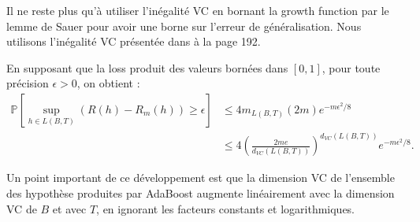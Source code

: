 \documentclass[12pt]{article}
\begin{document}
	Il ne reste plus qu'à utiliser l'inégalité VC en bornant la growth function par le lemme de Sauer pour avoir une borne sur l'erreur de généralisation.
	Nous utilisons l'inégalité VC présentée dans \cite{Bousquet2003-oz} à la page 192.
	
	En supposant que la loss produit des valeurs bornées dans $[0, 1]$, pour toute précision $\epsilon > 0$, on obtient :
	\begin{align*}
	\mathbb{P}\left[ \sup_{h \in L(B, T)} (R(h) - R_m(h)) \geq \epsilon \right] &\leq 4 m_{L(B, T)}(2 m) e^{-m \epsilon^2 / 8} \\
	&\leq 4 \left( \frac{2 m e}{d_{VC}(L(B, T))} \right)^{d_{VC}(L(B, T))} e^{-m \epsilon^2 / 8}.
	\end{align*}

	Un point important de ce développement est que la dimension VC de l'ensemble des hypothèse produites par AdaBoost augmente linéairement avec la dimension VC de $B$ et avec $T$, en ignorant les facteurs constants et logarithmiques.
	
	
	
	
\end{document}
